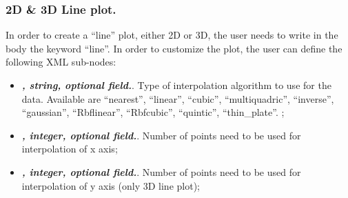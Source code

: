 \subsubsection{2D \& 3D Line plot.}
In order to create a ``line'' plot, either 2D or 3D, the user needs to write in
the  body the keyword ``line''.
%
In order to customize the plot, the user can define the following XML sub-nodes:
  \begin{itemize}
  \item {}\textbf{\textit{, string, optional field.}}.
  Type of interpolation algorithm to use for the data.
  Available are ``nearest'', ``linear'', ``cubic'', ``multiquadric'',
  ``inverse'', ``gaussian'', ``Rbflinear'', ``Rbfcubic'', ``quintic'',
  ``thin\_plate''.
  ;
  \item {}\textbf{\textit{, integer, optional field.}}.
  Number of points need to be used for interpolation of x axis;
  \item {}\textbf{\textit{, integer, optional field.}}.
  Number of points need to be used for interpolation of y axis (only 3D line
  plot);
    \end{itemize}

